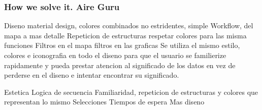 \subsubsection{How we solve it. Aire Guru} 
Diseno material design, colores combinados no estridentes, simple
Workflow, del mapa a mas detalle
Repeticion de estructuras
respetar colores para las misma funciones
Filtros en el mapa
filtros en las graficas
Se utiliza el mismo estilo, colores e iconografia en todo el diseno para que el usuario se familierize rapidamente y pueda
prestar atencion al significado de los datos en vez de perderse en el diseno e intentar encontrar su significado. 
\begin{itemize}
    \done Estetica
    \done Logica de secuencia
    \done Familiaridad, repeticion de estructuras y colores que representan lo mismo
    \done Selecciones
    \crossed Tiempos de espera
    \crossed Mas diseno
    
\end{itemize}
\newpage